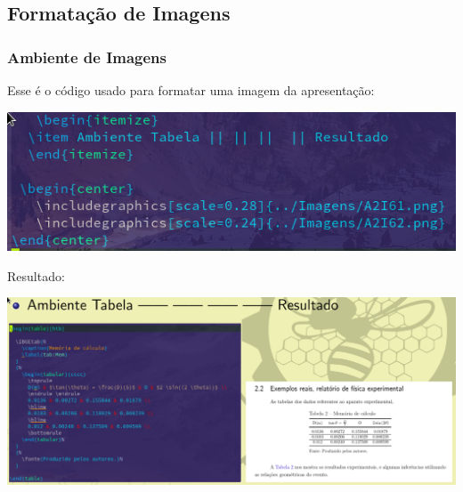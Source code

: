 \documentclass{beamer}
\begin{document}
\begin{frame}
  \section{Formatação de  Imagens}
  \frametitle{Ambiente de Imagens}
  Esse é o código usado para formatar uma imagem da apresentação:
  \begin{center}
    \includegraphics[scale=0.30]{../Imagens/A2I91.png}
  \end{center}
  Resultado:
  \begin{center}
    \includegraphics[scale=0.23]{../Imagens/A2I92.png}
  \end{center}
\end{frame}
\end{document}
